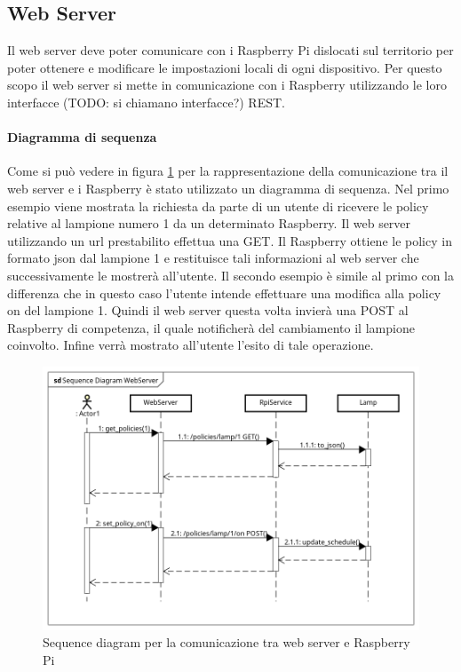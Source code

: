 \subsection{Web Server}
Il web server deve poter comunicare con i Raspberry Pi dislocati sul territorio per poter ottenere e modificare le impostazioni locali di ogni dispositivo.
Per questo scopo il web server si mette in comunicazione con i Raspberry utilizzando le loro interfacce (TODO: si chiamano interfacce?) REST.
\paragraph{Diagramma di sequenza}
Come si può vedere in figura \ref{SD WEB} per la rappresentazione della comunicazione tra il web server e i Raspberry è stato utilizzato un diagramma di sequenza.
Nel primo esempio viene mostrata la richiesta da parte di un utente di ricevere le policy relative al lampione numero 1 da un determinato Raspberry.
Il web server utilizzando un url prestabilito effettua una GET. Il Raspberry ottiene le policy in formato json dal lampione 1 e restituisce tali informazioni al web server che successivamente le mostrerà all'utente.
Il secondo esempio è simile al primo con la differenza che in questo caso l'utente intende effettuare una modifica alla policy on del lampione 1. Quindi il web server questa volta invierà una POST al Raspberry di competenza, il quale notificherà del cambiamento il lampione coinvolto. Infine verrà mostrato all'utente l'esito di tale operazione.
\begin{figure}[tbp]
	\centering
	\includegraphics[scale=.55]{figure/Sequence_Diagram_WebServer.png}
	\caption{Sequence diagram per la comunicazione tra web server e Raspberry Pi \label{SD WEB}}
\end{figure}


